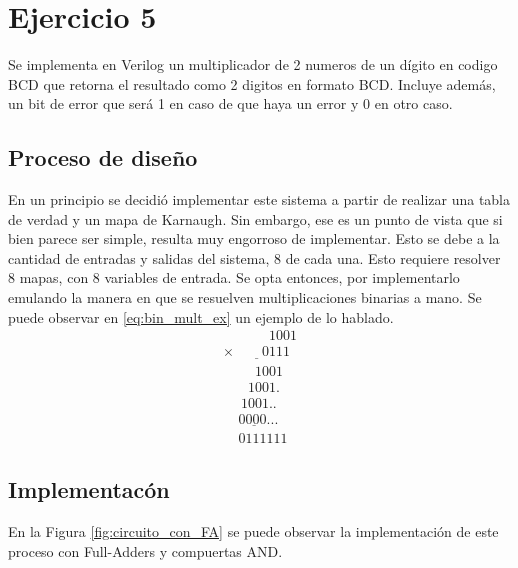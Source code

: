 \section{Ejercicio 5}
Se implementa en Verilog un multiplicador de 2 numeros de un d\'igito en codigo BCD que retorna el resultado como 2 digitos en formato BCD. Incluye adem\'as, un bit de error que ser\'a 1 en caso de que haya un error y 0 en otro caso.

\subsection{Proceso de dise\~no}
En un principio se decidi\'o implementar este sistema a partir de realizar una tabla de verdad y un mapa de Karnaugh. Sin embargo, ese es un punto de vista que si bien parece ser simple, resulta muy engorroso de implementar. Esto se debe a la cantidad de entradas y salidas del sistema, 8 de cada una. Esto requiere resolver 8 mapas, con 8 variables de entrada.
Se opta entonces, por implementarlo emulando la manera en que se resuelven multiplicaciones binarias a mano. Se puede observar en \ref{eq:bin_mult_ex} un ejemplo de lo hablado.
\begin{equation}
    \begin{array}{c}
        \phantom{\times99999}1001\\
        \underline{\times\phantom{9999}0111}\\ %
        \phantom{\times 999}1001\\
        \phantom{\times 99}1001.\\
        \phantom{\times9}1001..\\        
        \underline{\phantom\times0000...\phantom9}\\
        \phantom\times0111111
    \end{array}
    \label{eq:bin_mult_ex}
\end{equation}


\subsection{Implementac\'on}
En la Figura \ref{fig:circuito_con_FA} se puede observar la implementaci\'on de este proceso con Full-Adders y compuertas AND.

